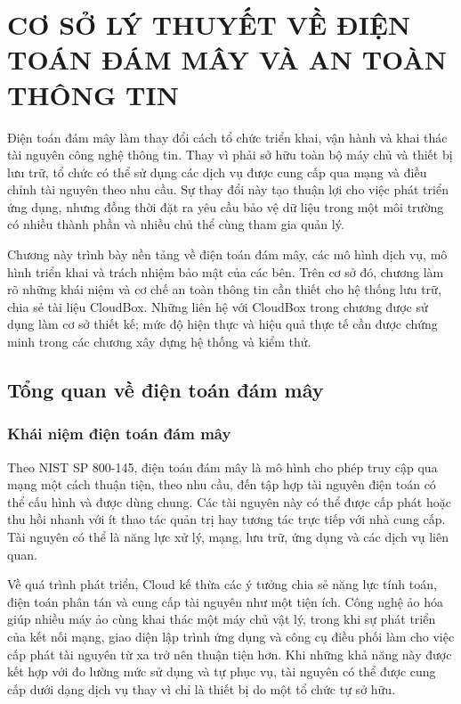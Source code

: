 \chapter{CƠ SỞ LÝ THUYẾT VỀ ĐIỆN TOÁN ĐÁM MÂY VÀ AN TOÀN THÔNG TIN}
\label{chap:cosolythuyet}
Điện toán đám mây làm thay đổi cách tổ chức triển khai, vận hành và khai thác tài nguyên công nghệ thông tin. Thay vì phải sở hữu toàn bộ máy chủ và thiết bị lưu trữ, tổ chức có thể sử dụng các dịch vụ được cung cấp qua mạng và điều chỉnh tài nguyên theo nhu cầu. Sự thay đổi này tạo thuận lợi cho việc phát triển ứng dụng, nhưng đồng thời đặt ra yêu cầu bảo vệ dữ liệu trong một môi trường có nhiều thành phần và nhiều chủ thể cùng tham gia quản lý.

Chương này trình bày nền tảng về điện toán đám mây, các mô hình dịch vụ, mô hình triển khai và trách nhiệm bảo mật của các bên. Trên cơ sở đó, chương làm rõ những khái niệm và cơ chế an toàn thông tin cần thiết cho hệ thống lưu trữ, chia sẻ tài liệu CloudBox. Những liên hệ với CloudBox trong chương được sử dụng làm cơ sở thiết kế; mức độ hiện thực và hiệu quả thực tế cần được chứng minh trong các chương xây dựng hệ thống và kiểm thử.

\section{Tổng quan về điện toán đám mây}
\subsection{Khái niệm điện toán đám mây}
Theo NIST SP 800-145, điện toán đám mây là mô hình cho phép truy cập qua mạng một cách thuận tiện, theo nhu cầu, đến tập hợp tài nguyên điện toán có thể cấu hình và được dùng chung. Các tài nguyên này có thể được cấp phát hoặc thu hồi nhanh với ít thao tác quản trị hay tương tác trực tiếp với nhà cung cấp. Tài nguyên có thể là năng lực xử lý, mạng, lưu trữ, ứng dụng và các dịch vụ liên quan.\cite{nistcloud}

Về quá trình phát triển, Cloud kế thừa các ý tưởng chia sẻ năng lực tính toán, điện toán phân tán và cung cấp tài nguyên như một tiện ích. Công nghệ ảo hóa giúp nhiều máy ảo cùng khai thác một máy chủ vật lý, trong khi sự phát triển của kết nối mạng, giao diện lập trình ứng dụng và công cụ điều phối làm cho việc cấp phát tài nguyên từ xa trở nên thuận tiện hơn. Khi những khả năng này được kết hợp với đo lường mức sử dụng và tự phục vụ, tài nguyên có thể được cung cấp dưới dạng dịch vụ thay vì chỉ là thiết bị do một tổ chức tự sở hữu.

